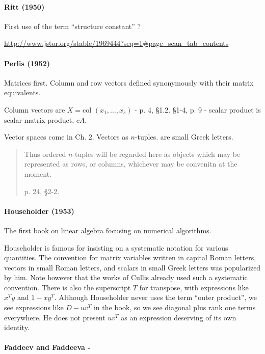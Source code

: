 \paragraph{Ritt (1950)~\cite{Ritt1950}}

First use of the term ``structure constant'' ?

\url{http://www.jstor.org/stable/1969444?seq=1#page_scan_tab_contents}


\paragraph{Perlis (1952)~\cite{Perlis1952}}

Matrices first. Column and row vectors defined synonymously with their matrix equivalents.

Column vectors are $X = \textrm{col }(x_1, \dots, x_s)$ - p. 4, \S 1.2.
\S 1-4, p. 9 - scalar product is scalar-matrix product, $c A$.

Vector spaces come in Ch. 2. Vectors as $n$-tuples. are small Greek letters.

\begin{quote}
Thus ordered $n$-tuples will be regarded here as objects which may be represented as rows, or columns, whichever may be convenitn at the moment.

p. 24, \S2-2.
\end{quote}


\paragraph{Householder (1953)~\cite{Householder1953}}

The first book on linear algebra focusing on numerical algorithms.

Householder is famous for insisting on a systematic notation for various quantities.
The convention for matrix variables written in capital Roman letters, vectors in small Roman letters, and scalars in small Greek letters was popularized by him. Note however that the works of Cullis already used such a systematic convention.
There is also the superscript $T$ for transpose, with expressions like $x^T y$ and $1 - x y^T$.
Although Householder never uses the term ``outer product'', we see expressions like $D - u v^T$ in the book, so we see diagonal plus rank one terms everywhere. He does not present $u v^T$ as an expression deserving of its own identity.


\paragraph{Faddeev and Faddeeva - \cite{Faddeev1959}}

